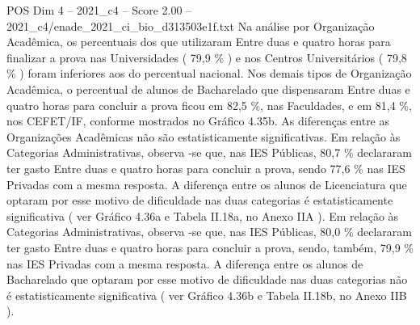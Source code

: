 \begin{textsample}{POS Dim 4 – 2021\_c4 – Score 2.00 – 2021\_c4/enade\_2021\_ci\_bio\_d313503e1f.txt}
Na análise por Organização Acadêmica, os percentuais dos que utilizaram Entre duas e quatro horas para finalizar a prova nas Universidades ( 79,9 \% ) e nos Centros Universitários ( 79,8 \% ) foram inferiores aos do percentual nacional.
Nos demais tipos de Organização Acadêmica, o percentual de alunos de Bacharelado que dispensaram Entre duas e quatro horas para concluir a prova ficou em 82,5 \%, nas Faculdades, e em 81,4 \%, nos CEFET/IF, conforme mostrados no Gráfico 4.35b.
As diferenças entre as Organizações Acadêmicas não são estatisticamente significativas.
Em relação às Categorias Administrativas, observa -se que, nas IES Públicas, 80,7 \% declararam ter gasto Entre duas e quatro horas para concluir a prova, sendo 77,6 \% nas IES Privadas com a mesma resposta.
A diferença entre os alunos de Licenciatura que optaram por esse motivo de dificuldade nas duas categorias é estatisticamente significativa ( ver Gráfico 4.36a e Tabela II.18a, no Anexo IIA ).
Em relação às Categorias Administrativas, observa -se que, nas IES Públicas, 80,0 \% declararam ter gasto Entre duas e quatro horas para concluir a prova, sendo, também, 79,9 \% nas IES Privadas com a mesma resposta.
A diferença entre os alunos de Bacharelado que optaram por esse motivo de dificuldade nas duas categorias não é estatisticamente significativa ( ver Gráfico 4.36b e Tabela II.18b, no Anexo IIB ).

\end{textsample}
